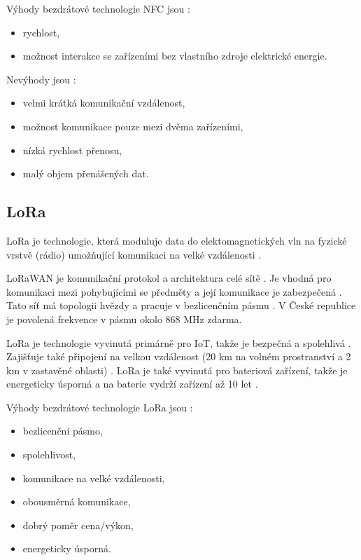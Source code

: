 Výhody bezdrátové technologie NFC jsou \cite{Bezdrat_muni}:
\begin{itemize}
  \item rychlost,
  \item možnost interakce se zařízeními bez vlastního zdroje elektrické energie.
\end{itemize}

Nevýhody jsou \cite{Bezdrat_muni}:
\begin{itemize}
  \item velmi krátká komunikační vzdálenost,
  \item možnost komunikace pouze mezi dvěma zařízeními, 
  \item nízká rychlost přenosu,
  \item malý objem přenášených dat.
\end{itemize}

\subsection{LoRa}
LoRa je technologie, která moduluje data do elektomagnetických vln na fyzické vrstvě (rádio) umožňující komunikaci na velké vzdálenosti \cite{LoRa_eman}. 

LoRaWAN je komunikační protokol a architektura celé sítě \cite{LoRa_eman}. Je vhodná pro komunikaci mezi pohybujícími se předměty a její komunikace je 
zabezpečená \cite{LoRa_eman}. Tato síť má topologii hvězdy a pracuje v bezlicenčním pásmu \cite{LoRa_eman}. V České republice je povolená frekvence v pásmu 
okolo 868 MHz zdarma.

LoRa je technologie vyvinutá primárně pro IoT, takže je bezpečná a spolehlivá \cite{LoRa_IoT_PORT}. Zajišťuje také připojení na velkou vzdálenost (20 km na 
volném prostranství a 2 km v zastavěné oblasti) \cite{LoRa_IoT_PORT}. LoRa je také vyvinutá pro bateriová zařízení, takže je energeticky úsporná a na baterie
 vydrží zařízení až 10 let \cite{LoRa_IoT_PORT}.

Výhody bezdrátové technologie LoRa jsou \cite{LoRa_IoT_PORT}:
\begin{itemize}
  \item bezlicenční pásmo,
  \item spolehlivost,
  \item komunikace na velké vzdálenosti,
  \item obousměrná komunikace,
  \item dobrý poměr cena/výkon,
  \item energeticky úsporná.
\end{itemize}


